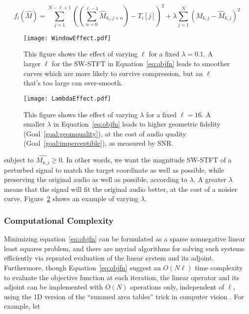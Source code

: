 \documentclass[runningheads]{llncs}
\begin{document}
\begin{equation}
  \label{eq:objfn}
  f_i(\hat{M}) = \sum_{j=1}^{N-\ell+1} \left( \left( \sum_{n = 0}^{\ell-1} \hat{M}_{k_i, j+n} \right) - T_i[j] \right)^2 + \lambda \sum_{j=1}^N \left( M_{k, j} - \hat{M}_{k, j} \right)^2
\end{equation}



\begin{figure}
  \centering
  \texttt{[image: WindowEffect.pdf]}
  \caption{This figure shows the effect of varying $\ell$ for a fixed $\lambda=0.1$.  A larger $\ell$ for the SW-STFT in Equation~\ref{eq:objfn} leads to smoother curves which are more likely to survive compression, but an $\ell$ that's too large can over-smooth.}
  \label{fig:WindowEffect}
\end{figure}

\begin{figure}
  \centering
  \texttt{[image: LambdaEffect.pdf]}
  \caption{This figure shows the effect of varying $\lambda$ for a fixed $\ell=16$.  A smaller $\lambda$ in Equation~\ref{eq:objfn} leads to higher geometric fidelity (Goal~\ref{goal:geomquality}), at the cost of audio quality (Goal~\ref{goal:imperceptible}), as measured by SNR.}
  \label{fig:LambdaEffect}
\end{figure}



subject to $\hat{M_{k, j}} \geq 0$.  In other words, we want the magnitude SW-STFT of a perturbed signal to match the target coordinate as well as possible, while preserving the original audio as well as possible, according to $\lambda$.  A greater $\lambda$ means that the signal will fit the original audio better, at the cost of a noisier curve.  Figure~\ref{fig:LambdaEffect} shows an example of varying $\lambda$.




\subsubsection{Computational Complexity}
\label{sec:computation}
Minimizing equation~\ref{eq:objfn} can be formulated as a sparse nonnegative linear least squares problem, and there are myriad algorithms for solving such systems efficiently via repeated evaluation of the linear system and its adjoint.  Furthermore, though Equation~\ref{eq:objfn} suggest an $O(N \ell)$ time complexity to evaluate the objective function at each iteration, the linear operator and its adjoint can be implemented with $O(N)$ operations only, independent of $\ell$, using the 1D version of the ``summed area tables'' trick in computer vision \cite{lewisfast}.  For example, let 
\end{document}

